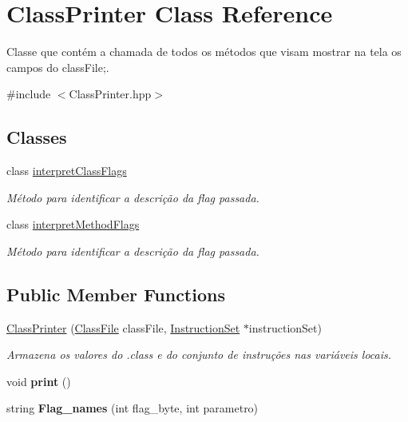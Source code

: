 \hypertarget{classClassPrinter}{}\section{Class\+Printer Class Reference}
\label{classClassPrinter}


Classe que contém a chamada de todos os métodos que visam mostrar na tela os campos do class\+File;.  




{\ttfamily \#include $<$Class\+Printer.\+hpp$>$}

\subsection*{Classes}
\begin{DoxyCompactItemize}
\item 
class \hyperlink{classClassPrinter_1_1interpretClassFlags}{interpret\+Class\+Flags}
\begin{DoxyCompactList}\small\item\em Método para identificar a descrição da flag passada. \end{DoxyCompactList}\item 
class \hyperlink{classClassPrinter_1_1interpretMethodFlags}{interpret\+Method\+Flags}
\begin{DoxyCompactList}\small\item\em Método para identificar a descrição da flag passada. \end{DoxyCompactList}\end{DoxyCompactItemize}
\subsection*{Public Member Functions}
\begin{DoxyCompactItemize}
\item 
\hyperlink{classClassPrinter_ae6f4be2efe9a9e3e6056304330dc7430}{Class\+Printer} (\hyperlink{classClassFile}{Class\+File} class\+File, \hyperlink{classInstructionSet}{Instruction\+Set} $\ast$instruction\+Set)
\begin{DoxyCompactList}\small\item\em Armazena os valores do .class e do conjunto de instruções nas variáveis locais. \end{DoxyCompactList}\item 
void {\bfseries print} ()\hypertarget{classClassPrinter_a8871ec5a8e14410486d1aa1fa93323eb}{}\label{classClassPrinter_a8871ec5a8e14410486d1aa1fa93323eb}

\item 
string {\bfseries Flag\+\_\+names} (int flag\+\_\+byte, int parametro)\hypertarget{classClassPrinter_a9883cb947ce417ffe130175a93d9fd32}{}\label{classClassPrinter_a9883cb947ce417ffe130175a93d9fd32}

\end{DoxyCompactItemize}


